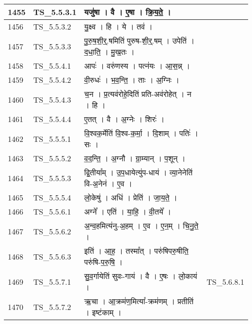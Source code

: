 \documentclass[17pt]{extarticle}
\begin{document}
\begin{longtable}{||p{0.4in}||p{0.9in}||p{4.0in}||p{0.9in}||}
            1455 & TS\_5.5.3.1 & यजु॑षा   ।   वै   ।   ए॒षा   ।   क्रि॒य॒ते॒   ।    &      \\
        \hline
            1456 & TS\_5.5.3.2 & यु॒क्ष्व   ।   हि   ।   ये   ।   तव॑   ।    &      \\
        \hline
            1457 & TS\_5.5.3.3 & पु॒रु॒ष॒शी॒र्॒.षमिति॑ पुरुष{-}शी॒र्॒.षम्   ।   उपेति॑   ।   द॒धा॒ति॒   ।   मु॒ख॒तः   ।    &      \\
        \hline
            1458 & TS\_5.5.4.1 & आपः॑   ।   वरु॑णस्य   ।   पत्न॑यः   ।   आ॒स॒न्न्   ।    &      \\
        \hline
            1459 & TS\_5.5.4.2 & वी॒रुधः॑   ।   भ॒व॒न्ति॒   ।   ताः   ।   अ॒ग्निः   ।    &      \\
        \hline
            1460 & TS\_5.5.4.3 & च॒न   ।   प्र॒त्यव॑रोहे॒दिति॑ प्रति{-}अव॑रोहेत्   ।   न   ।   हि   ।    &      \\
        \hline
            1461 & TS\_5.5.4.4 & ए॒तत्   ।   वै   ।   अ॒ग्नेः   ।   शिरः॑   ।    &      \\
        \hline
            1462 & TS\_5.5.5.1 & वि॒श्वक॒र्मेति॑ वि॒श्व{-}क॒र्मा॒   ।   दि॒शाम्   ।   पतिः॑   ।   सः   ।    &      \\
        \hline
            1463 & TS\_5.5.5.2 & व॒द॒न्ति॒   ।   अ॒ग्नौ   ।   ग्रा॒म्यान्   ।   प॒शून्   ।    &      \\
        \hline
            1464 & TS\_5.5.5.3 & द्वि॒तीया᳚म्   ।   उ॒प॒धायेत्यु॑प{-}धाय॑   ।   व्या॒नेनेति॑ वि{-}अ॒नेन॑   ।   ए॒व   ।    &      \\
        \hline
            1465 & TS\_5.5.5.4 & लो॒केषु॑   ।   अधि॑   ।   प्रेति॑   ।   जा॒य॒ते॒   ।    &      \\
        \hline
            1466 & TS\_5.5.6.1 & अग्ने᳚   ।   एति॑   ।   या॒हि॒   ।   वी॒तये᳚   ।    &      \\
        \hline
            1467 & TS\_5.5.6.2 & अ॒न्व॒हमित्य॑नु{-}अ॒हम्   ।   ए॒व   ।   ए॒न॒म्   ।   चि॒नु॒ते॒   ।    &      \\
        \hline
            1468 & TS\_5.5.6.3 & इति॑   ।   आ॒ह॒   ।   तस्मा᳚त्   ।   परु॑षिपरु॒षीति॒ परु॑षि{-}प॒रु॒षि॒   ।    &      \\
        \hline
            1469 & TS\_5.5.7.1 & सु॒व॒र्गायेति॑ सुवः{-}गाय॑   ।   वै   ।   ए॒षः   ।   लो॒काय॑   ।    &  TS\_5.6.8.1       \\
        \hline
            1470 & TS\_5.5.7.2 & ऋ॒चा   ।   आ॒क्रम॑ण॒मित्या᳚{-}क्रम॑णम्   ।   प्रतीति॑   ।   इष्ट॑काम्   ।    &      \\

\end{longtable}
\end{document}
